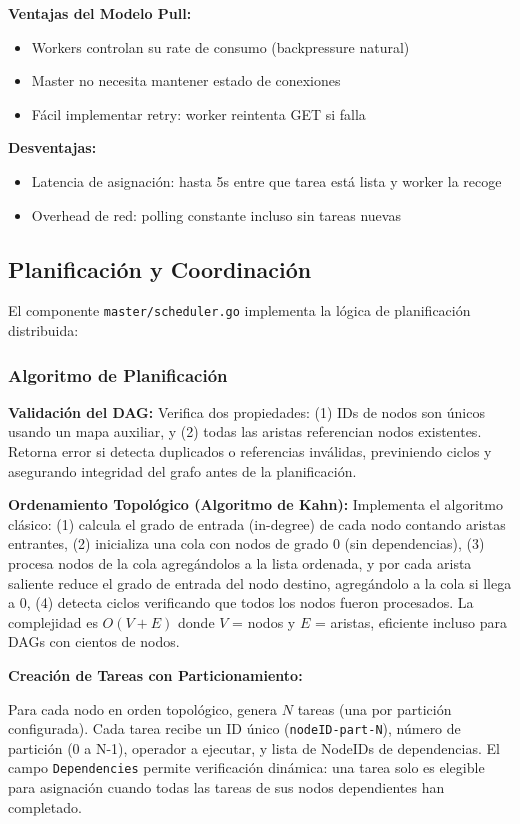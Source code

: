 \documentclass[conference]{IEEEtran}
\begin{document}
\textbf{Ventajas del Modelo Pull:}
\begin{itemize}
\item Workers controlan su rate de consumo (backpressure natural)
\item Master no necesita mantener estado de conexiones
\item Fácil implementar retry: worker reintenta GET si falla
\end{itemize}

\textbf{Desventajas:}
\begin{itemize}
\item Latencia de asignación: hasta 5s entre que tarea está lista y worker la recoge
\item Overhead de red: polling constante incluso sin tareas nuevas
\end{itemize}

\subsection{Planificación y Coordinación}

El componente \texttt{master/scheduler.go} implementa la lógica de planificación distribuida:

\subsubsection{Algoritmo de Planificación}

\textbf{Validación del DAG:} Verifica dos propiedades: (1) IDs de nodos son únicos usando un mapa auxiliar, y (2) todas las aristas referencian nodos existentes. Retorna error si detecta duplicados o referencias inválidas, previniendo ciclos y asegurando integridad del grafo antes de la planificación.

\textbf{Ordenamiento Topológico (Algoritmo de Kahn):} Implementa el algoritmo clásico: (1) calcula el grado de entrada (in-degree) de cada nodo contando aristas entrantes, (2) inicializa una cola con nodos de grado 0 (sin dependencias), (3) procesa nodos de la cola agregándolos a la lista ordenada, y por cada arista saliente reduce el grado de entrada del nodo destino, agregándolo a la cola si llega a 0, (4) detecta ciclos verificando que todos los nodos fueron procesados. La complejidad es $O(V + E)$ donde $V$ = nodos y $E$ = aristas, eficiente incluso para DAGs con cientos de nodos.

\textbf{Creación de Tareas con Particionamiento:}

Para cada nodo en orden topológico, genera $N$ tareas (una por partición configurada). Cada tarea recibe un ID único (\texttt{nodeID-part-N}), número de partición (0 a N-1), operador a ejecutar, y lista de NodeIDs de dependencias. El campo \texttt{Dependencies} permite verificación dinámica: una tarea solo es elegible para asignación cuando todas las tareas de sus nodos dependientes han completado.
\end{document}

